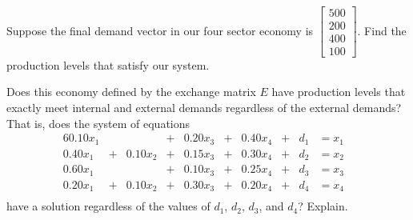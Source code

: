 \begin{pactivity} ~
	\ba
	\item Suppose the final demand vector in our four sector economy is  $\left[ \begin{array}{c} 500 \\200 \\ 400 \\ 100 \end{array}\right]$. Find the production levels that satisfy our system.


\item Does this economy defined by the exchange matrix $E$ have production levels that exactly meet internal and external demands regardless of the external demands? That is, does the system of equations
\begin{alignat*}{6}
{0.10}x_1		&{}{}	&{}				&{}+{}	&{0.20}x_3 &{}+{}	&{0.40}x_4 &{}+{}	&{}d_1	&= x_1&{}   \\
{0.40}x_1		&{}+{}	&{0.10}x_2		&{}+{}	&{0.15}x_3 &{}+{}	&{0.30}x_4 &{}+{}	&{}d_2	&= x_2&{}   \\
{0.60}x_1		&{}{}	&{}				&{}+{}	&{0.10}x_3 &{}+{}	&{0.25}x_4 &{}+{}	&{}d_3	&= x_3&{}   \\
{0.20}x_1		&{}+{}	&{0.10}x_2		&{}+{}	&{0.30}x_3 &{}+{}	&{0.20}x_4 &{}+{}	&{}d_4	&= x_4&{}   \\
\end{alignat*}
have a solution regardless of the values of $d_1$, $d_2$, $d_3$, and $d_4$? Explain.


	\ea
	
\end{pactivity}



